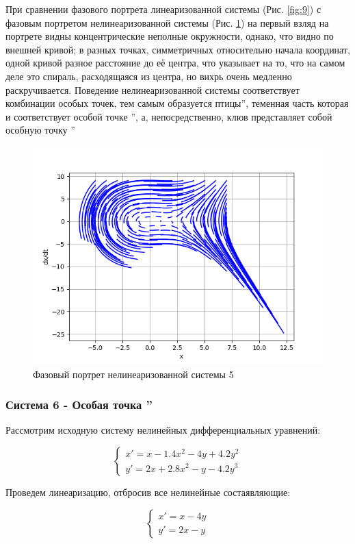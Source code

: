 При сравнении фазового портрета линеаризованной системы (Рис. \ref{fig:9}) с фазовым портретом нелинеаризованной системы
(Рис. \ref{fig:10}) на первый взляд на портрете видны концентрические неполные окружности, однако, что видно по внешней кривой; 
в разных точках, симметричных относительно начала координат, одной кривой разное расстояние до её центра, что указывает на то, что на самом деле это 
спираль, расходящаяся из центра, но вихрь очень медленно раскручивается. Поведение нелинеаризованной системы соответствует
комбинации особых точек, тем самым образуется  птицы\textquotedblright, теменная часть которая и соответствует особой точке
\textquotedblright, а, непосредственно, клюв представляет собой особную точку \textquotedblright

\begin{figure}[H]
	\centering
	\includegraphics[width=0.6\linewidth]{body/images/System-5.png}
	\caption{Фазовый портрет нелинеаризованной системы 5}
	\label{fig:10}
\end{figure}

\subsubsection{Система 6 - Особая точка \textquotedblright}

Рассмотрим исходную систему нелинейных дифференциальных уравнений:

$$
\begin{cases}
x' = x - 1.4 x^2 - 4y + 4.2y^2\\
y' = 2x + 2.8x^2 - y - 4.2y^3
\end{cases}
$$

Проведем линеаризацию, отбросив все нелинейные состаявляющие:

$$
\begin{cases}
	x' = x - 4y\\
	y' = 2x - y
\end{cases}
$$

